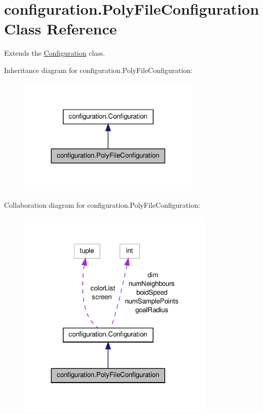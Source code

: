 \hypertarget{classconfiguration_1_1PolyFileConfiguration}{\section{configuration.\-Poly\-File\-Configuration Class Reference}
\label{classconfiguration_1_1PolyFileConfiguration}
}


Extends the \hyperlink{classconfiguration_1_1Configuration}{Configuration} class.  




Inheritance diagram for configuration.\-Poly\-File\-Configuration\-:\nopagebreak
\begin{figure}[H]
\begin{center}
\leavevmode
\includegraphics[width=248pt]{classconfiguration_1_1PolyFileConfiguration__inherit__graph}
\end{center}
\end{figure}


Collaboration diagram for configuration.\-Poly\-File\-Configuration\-:\nopagebreak
\begin{figure}[H]
\begin{center}
\leavevmode
\includegraphics[width=269pt]{classconfiguration_1_1PolyFileConfiguration__coll__graph}
\end{center}
\end{figure}
